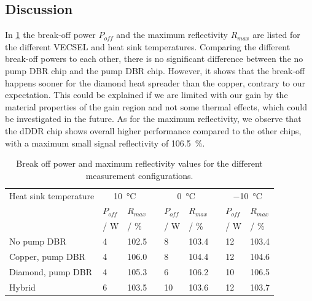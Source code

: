 \subsection*{Discussion}

In \cref{tab:rss} the break-off power $P_{off}$ and the maximum reflectivity $R_{max}$ are listed for the different VECSEL and heat sink temperatures. Comparing the different break-off powers to each other, there is no significant difference between the no pump DBR chip and the pump DBR chip. However, it shows that the break-off happens sooner for the diamond heat spreader than the copper, contrary to our expectation. This could be explained if we are limited with our gain by the material properties of the gain region and not some thermal effects, which could be investigated in the future. As for the maximum reflectivity, we observe that the dDDR chip shows overall higher performance compared to the other chips,  with a maximum small signal reflectivity of \qty{106.5}{\percent}.

\begin{table}[ht]
    \centering
    \begin{tabular}{lllllllll}
        \hline
        Heat sink temperature & \multicolumn{2}{c}{\qty{10}{\celsius}} &             & \multicolumn{2}{c}{\qty{0}{\celsius}} &           & \multicolumn{2}{c}{\qty{-10}{\celsius}}                              \\ \cline{2-3} \cline{5-6} \cline{8-9}
                              & $P_{off}$                              & $R_{max}$   &                                       & $P_{off}$ & $R_{max}$                               &  & $P_{off}$ & $R_{max}$   \\ 
                              & / \unit{\W} & / \unit{\percent} & &  / \unit{\W} & / \unit{\percent} & & / \unit{\W} & / \unit{\percent} \\ \hline
        No pump DBR           & 4                                      & \num{102.5} &                                       & 8         & \num{103.4}                             &  & 12        & \num{103.4} \\ \hline
        Copper, pump DBR      & 4                                      & \num{106.0} &                                       & 8         & \num{104.4}                             &  & 12        & \num{104.6} \\ \hline
        Diamond, pump DBR     & 4                                      & \num{105.3} &                                       & 6         & \num{106.2}                             &  & 10        & \num{106.5} \\ \hline
        Hybrid                & 6                                      & \num{103.5} &                                       & 10        & \num{103.6}                             &  & 12        & \num{103.7}
    \end{tabular}
    \caption{Break off power and maximum reflectivity values for the different measurement configurations.}
    \label{tab:rss}
\end{table}
\vspace{-2\baselineskip}


